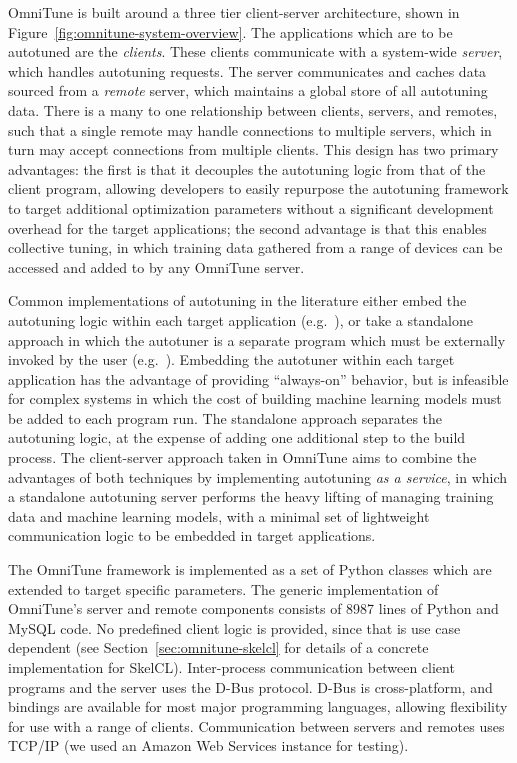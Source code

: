   OmniTune is built around a three tier client-server architecture,
  shown in Figure~\ref{fig:omnitune-system-overview}. The applications
  which are to be autotuned are the \emph{clients}. These clients
  communicate with a system-wide \emph{server}, which handles autotuning
  requests. The server communicates and caches data sourced from a
  \emph{remote} server, which maintains a global store of all autotuning
  data. There is a many to one relationship between clients, servers,
  and remotes, such that a single remote may handle connections to
  multiple servers, which in turn may accept connections from multiple
  clients. This design has two primary advantages: the first is that it
  decouples the autotuning logic from that of the client program,
  allowing developers to easily repurpose the autotuning framework to
  target additional optimization parameters without a significant
  development overhead for the target applications; the second advantage
  is that this enables collective tuning, in which training data
  gathered from a range of devices can be accessed and added to by any
  OmniTune server.

  Common implementations of autotuning in the literature either embed
  the autotuning logic within each target application
  (e.g.~\cite{Chen2014}), or take a standalone approach in which the
  autotuner is a separate program which must be externally invoked by
  the user (e.g.~\cite{Lutz2013}). Embedding the autotuner within each
  target application has the advantage of providing ``always-on''
  behavior, but is infeasible for complex systems in which the cost of
  building machine learning models must be added to each program
  run. The standalone approach separates the autotuning logic, at the
  expense of adding one additional step to the build process. The
  client-server approach taken in OmniTune aims to combine the
  advantages of both techniques by implementing autotuning \emph{as a
  service}, in which a standalone autotuning server performs the heavy
  lifting of managing training data and machine learning models, with a
  minimal set of lightweight communication logic to be embedded in
  target applications.

  The OmniTune framework is implemented as a set of Python classes which are extended to target specific parameters. The generic implementation of OmniTune's server and remote components consists of 8987 lines of Python and MySQL code. No predefined client logic is provided, since that is use case dependent (see Section~\ref{sec:omnitune-skelcl} for details of a concrete implementation for SkelCL). Inter-process communication between client programs and the server uses the D-Bus protocol. D-Bus is cross-platform, and bindings are available for most major programming languages, allowing flexibility for use with a range of clients. Communication between servers and remotes uses TCP/IP (we used an Amazon Web Services instance for testing).


